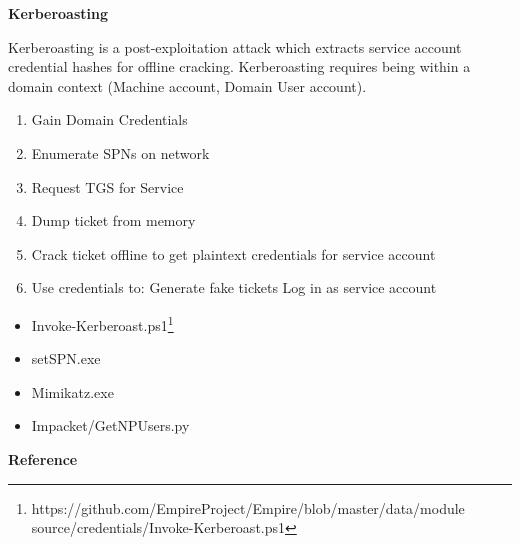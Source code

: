\documentclass[a4paper,10pt]{article}
\begin{document}
\newpage
\Huge{\textbf{Kerberoasting}}
\newline
\normalsize
\vspace{1cm}
\begin{tcolorbox}[breakable,title=Notes]
Kerberoasting is a post-exploitation attack which extracts service account credential hashes for offline cracking.
Kerberoasting requires being within a domain context (Machine account, Domain User account).
\begin{enumerate}
	\itemsep0em
	\item Gain Domain Credentials
	\item Enumerate SPNs on network
	\item Request TGS for Service
	\item Dump ticket from memory
	\item Crack ticket offline to get plaintext credentials for service account
	\item Use credentials to:
	\subitem Generate fake tickets
	\subitem Log in as service account
\end{enumerate}
\end{tcolorbox}
\begin{tcolorbox}[breakable,title=Windows Tools and Scripts]
\begin{itemize}
	\itemsep0em
	\item Invoke-Kerberoast.ps1\footnote{https://github.com/EmpireProject/Empire/blob/master/data/module
		source/credentials/Invoke-Kerberoast.ps1}
	\item setSPN.exe
	\item Mimikatz.exe
\end{itemize}
\end{tcolorbox}
\begin{tcolorbox}[breakable,title=Linux Tools and Scripts]
\begin{itemize}
	\itemsep0em
	\item Impacket/GetNPUsers.py
\end{itemize}
\end{tcolorbox}
\newpage
\Huge{\textbf{Reference}}
\newline
\normalsize
\end{document}
